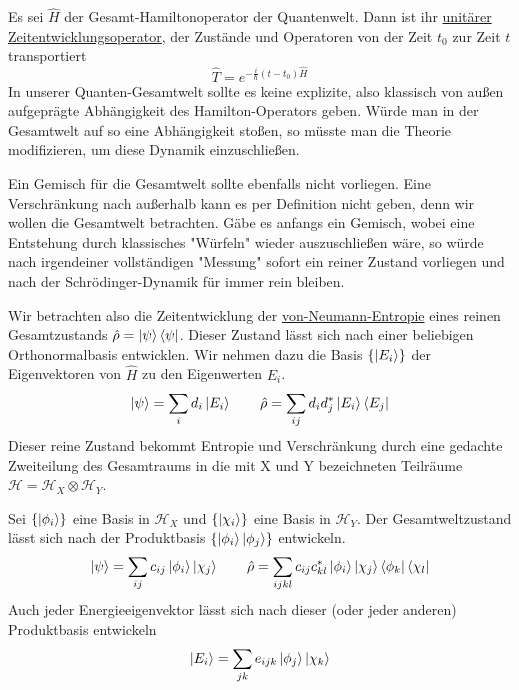 \documentclass[12pt]{article}
\begin{document}
Es sei $\hat{H}$ der Gesamt-Hamiltonoperator der Quantenwelt. Dann ist ihr \href{https://de.wikipedia.org/wiki/Zeitentwicklungsoperator}{unitärer Zeitentwicklungsoperator}, der Zustände und Operatoren von der Zeit $t_0$ zur Zeit $t$ transportiert
\begin{equation}
\label{eq:propagator}
\hat{T}=e^{-\frac{i}{\hbar}(t-t_0)\hat{H}}
\end{equation}
In unserer Quanten-Gesamtwelt sollte es keine explizite, also klassisch von außen aufgeprägte Abhängigkeit des Hamilton-Operators geben. Würde man in der Gesamtwelt auf so eine Abhängigkeit stoßen, so müsste man die Theorie modifizieren, um diese Dynamik einzuschließen.

Ein Gemisch für die Gesamtwelt sollte ebenfalls nicht vorliegen. Eine Verschränkung nach außerhalb kann es per Definition nicht geben, denn wir wollen die Gesamtwelt betrachten. Gäbe es anfangs ein Gemisch, wobei eine Entstehung durch klassisches "Würfeln" wieder auszuschließen wäre, so würde nach irgendeiner vollständigen "Messung" sofort ein reiner Zustand vorliegen und nach der Schrödinger-Dynamik für immer rein bleiben. 

Wir betrachten also die Zeitentwicklung der \href{https://de.wikipedia.org/wiki/Entropie#Von-Neumann-Entropie}{von-Neumann-Entropie} eines reinen Gesamtzustands $\hat{\rho}=\ket{\psi}\bra{\psi}$. Dieser Zustand lässt sich nach einer beliebigen Orthonormalbasis entwicklen. Wir nehmen dazu die Basis $\{\ket{E_i}\}$ der Eigenvektoren von $\hat{H}$ zu den Eigenwerten $E_i$.
\begin{equation}
\label{eq:psi_energy}
\ket{\psi}=\sum_{i}d_{i}\ket{E_i} \quad\quad
\hat{\rho}=\sum_{ij}d_{i}d_{j}^*\ket{E_i}\bra{E_j}
\end{equation}
Dieser reine Zustand bekommt Entropie und Verschränkung durch eine gedachte Zweiteilung des Gesamtraums in die mit X und Y bezeichneten Teilräume $\mathscr{H} = \mathscr{H}_X\otimes\mathscr{H}_Y$.

Sei $\{\ket{\phi_i}\}$ eine Basis in $\mathscr{H}_X$ und $\{\ket{\chi_i}\}$ eine Basis in $\mathscr{H}_Y$. Der Gesamtweltzustand lässt sich nach der Produktbasis $\{\ket{\phi_i}\ket{\phi_j}\}$ entwickeln.
\begin{equation}
\label{eq:psi_product}
\ket{\psi}=\sum_{ij}c_{ij}\ket{\phi_i}\ket{\chi_j} \quad\quad
\hat{\rho}=\sum_{ijkl}c_{ij}c_{kl}^*\ket{\phi_i}\ket{\chi_j}\bra{\phi_k}\bra{\chi_l}
\end{equation}
Auch jeder Energieeigenvektor lässt sich nach dieser (oder jeder anderen) Produktbasis entwickeln
\begin{equation}
\label{eq:energy_eigenvector}
\ket{E_i}=\sum_{jk}e_{ijk}\ket{\phi_j}\ket{\chi_k}
\end{equation}
\end{document}
